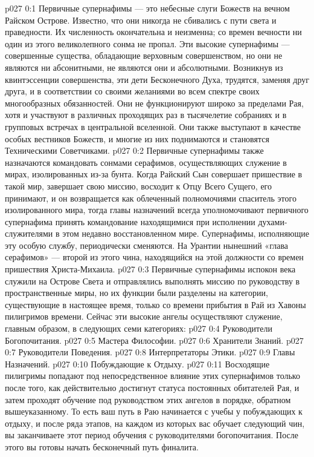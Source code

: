 \vs p027 0:1 Первичные супернафимы --- это небесные слуги Божеств на вечном Райском Острове. Известно, что они никогда не сбивались с пути света и праведности. Их численность окончательна и неизменна; со времен вечности ни один из этого великолепного сонма не пропал. Эти высокие супернафимы --- совершенные существа, обладающие верховным совершенством, но они не являются ни абсонитными, не являются они и абсолютными. Возникнув из квинтэссенции совершенства, эти дети Бесконечного Духа, трудятся, заменяя друг друга, и в соответствии со своими желаниями во всем спектре своих многообразных обязанностей. Они не функционируют широко за пределами Рая, хотя и участвуют в различных проходящих раз в тысячелетие собраниях и в групповых встречах в центральной вселенной. Они также выступают в качестве особых вестников Божеств, и многие из них поднимаются и становятся Техническими Советчиками.
\vs p027 0:2 Первичные супернафимы также назначаются командовать сонмами серафимов, осуществляющих служение в мирах, изолированных из\hyp{}за бунта. Когда Райский Сын совершает пришествие в такой мир, завершает свою миссию, восходит к Отцу Всего Сущего, его принимают, и он возвращается как облеченный полномочиями спаситель этого изолированного мира, тогда главы назначений всегда уполномочивают первичного супернафима принять командование находящимися при исполнении духами\hyp{}служителями в этом недавно восстановленном мире. Супернафимы, исполняющие эту особую службу, периодически сменяются. На Урантии нынешний «глава серафимов» --- второй из этого чина, находящийся на этой должности со времен пришествия Христа\hyp{}Михаила.
\vs p027 0:3 Первичные супернафимы испокон века служили на Острове Света и отправлялись выполнять миссию по руководству в пространственные миры, но их функции были разделены на категории, существующие в настоящее время, только со времени прибытия в Рай из Хавоны пилигримов времени. Сейчас эти высокие ангелы осуществляют служение, главным образом, в следующих семи категориях:
\vs p027 0:4 \bibnobreakspace Руководители Богопочитания.
\vs p027 0:5 \bibnobreakspace Мастера Философии.
\vs p027 0:6 \bibnobreakspace Хранители Знаний.
\vs p027 0:7 \bibnobreakspace Руководители Поведения.
\vs p027 0:8 \bibnobreakspace Интерпретаторы Этики.
\vs p027 0:9 \bibnobreakspace Главы Назначений.
\vs p027 0:10 \bibnobreakspace Побуждающие к Отдыху.
\vs p027 0:11 Восходящие пилигримы попадают под непосредственное влияние этих супернафимов только после того, как действительно достигнут статуса постоянных обитателей Рая, и затем проходят обучение под руководством этих ангелов в порядке, обратном вышеуказанному. То есть ваш путь в Раю начинается с учебы у побуждающих к отдыху, и после ряда этапов, на каждом из которых вас обучает следующий чин, вы заканчиваете этот период обучения с руководителями богопочитания. После этого вы готовы начать бесконечный путь финалита.

